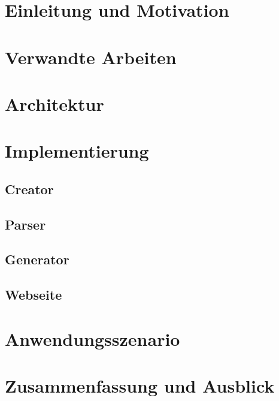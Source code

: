 \documentclass[a4paper,12pt,headsepline,twocolumn]{scrartcl}
\begin{document}
\section{Einleitung und Motivation}


\section{Verwandte Arbeiten}



\section{Architektur}



\section{Implementierung}

\subsection{Creator}



\subsection{Parser}



\subsection{Generator}



\subsection{Webseite}
%


\section{Anwendungsszenario}


\section{Zusammenfassung und Ausblick}

\end{document}
